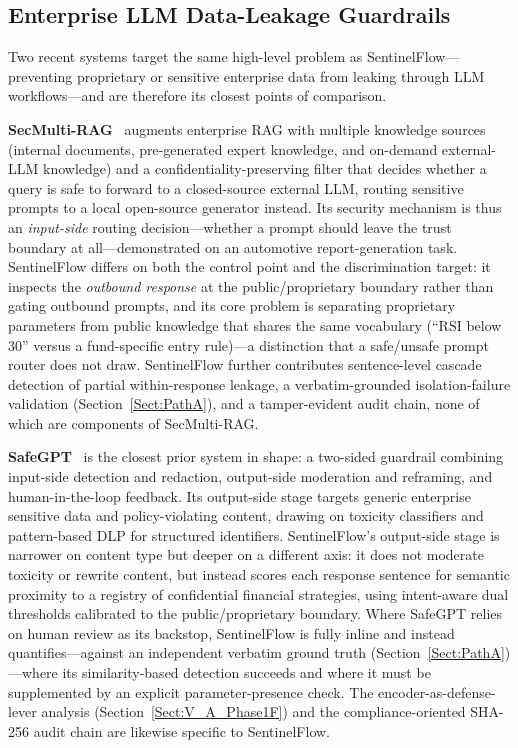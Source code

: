 \documentclass[journal]{IEEEtran}
\begin{document}
\subsection{Enterprise LLM Data-Leakage Guardrails}
\label{Sect:LR_Enterprise}

Two recent systems target the same high-level problem as SentinelFlow---preventing proprietary or sensitive enterprise data from leaking through LLM workflows---and are therefore its closest points of comparison.

\textbf{SecMulti-RAG}~\cite{secmulti_rag} augments enterprise RAG with multiple knowledge sources (internal documents, pre-generated expert knowledge, and on-demand external-LLM knowledge) and a confidentiality-preserving filter that decides whether a query is safe to forward to a closed-source external LLM, routing sensitive prompts to a local open-source generator instead. Its security mechanism is thus an \textit{input-side} routing decision---whether a prompt should leave the trust boundary at all---demonstrated on an automotive report-generation task. SentinelFlow differs on both the control point and the discrimination target: it inspects the \textit{outbound response} at the public/proprietary boundary rather than gating outbound prompts, and its core problem is separating proprietary parameters from public knowledge that shares the same vocabulary (``RSI below 30'' versus a fund-specific entry rule)---a distinction that a safe/unsafe prompt router does not draw. SentinelFlow further contributes sentence-level cascade detection of partial within-response leakage, a verbatim-grounded isolation-failure validation (Section~\ref{Sect:PathA}), and a tamper-evident audit chain, none of which are components of SecMulti-RAG.

\textbf{SafeGPT}~\cite{safegpt} is the closest prior system in shape: a two-sided guardrail combining input-side detection and redaction, output-side moderation and reframing, and human-in-the-loop feedback. Its output-side stage targets generic enterprise sensitive data and policy-violating content, drawing on toxicity classifiers and pattern-based DLP for structured identifiers. SentinelFlow's output-side stage is narrower on content type but deeper on a different axis: it does not moderate toxicity or rewrite content, but instead scores each response sentence for semantic proximity to a registry of confidential financial strategies, using intent-aware dual thresholds calibrated to the public/proprietary boundary. Where SafeGPT relies on human review as its backstop, SentinelFlow is fully inline and instead quantifies---against an independent verbatim ground truth (Section~\ref{Sect:PathA})---where its similarity-based detection succeeds and where it must be supplemented by an explicit parameter-presence check. The encoder-as-defense-lever analysis (Section~\ref{Sect:V_A_Phase1F}) and the compliance-oriented SHA-256 audit chain are likewise specific to SentinelFlow.
\end{document}

